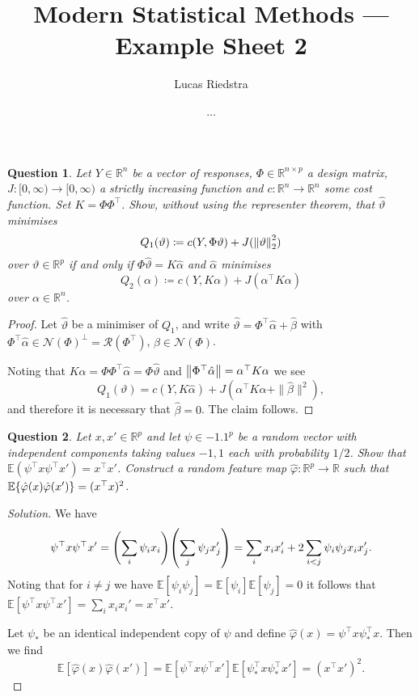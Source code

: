 \documentclass{article}
\title{Modern Statistical Methods --- Example Sheet 2} %
\author{Lucas Riedstra}
\date{...} %
\theoremstyle{plain}
\newtheorem{question}{Question}
\theoremstyle{remark}
\newenvironment{solution}{\begin{proof}[Solution]\renewcommand\qedsymbol{}}{\end{proof}}
\renewcommand{\theta}{\vartheta}
\renewcommand{\phi}{\varphi}
\newcommand{\Bb}{\mathbb}
\newcommand{\Cal}{\mathcal}
\newcommand{\RR}{\Bb R}
\newcommand{\EE}{\Bb E}
\newcommand{\T}{^\top} %
\newcommand\ceq\coloneqq %
\renewcommand\P{^\perp}
\newcommand\Nul{\Cal N}
\newcommand\Ran{\Cal R}
\begin{document}
\maketitle
\begin{question}
	Let $Y \in \RR^n$ be a vector of responses, $\Phi \in \RR^{n \times p}$ a design matrix, $J \colon [0, \infty) \to [0, \infty)$ a strictly increasing function and $c \colon \RR^n \to \RR^n$ some cost function. Set $K = \Phi\Phi\T$. Show, without using the representer theorem, that $\hat\theta$ minimises
	\[
	Q_1(\theta) \ceq c(Y, \Phi\theta) + J(\norm{\theta}_2^2)
	\]
	over $\theta \in \RR^p$ if and only if $\Phi\hat\theta = K\hat\alpha$ and $\hat\alpha$ minimises
	\[
	Q_2(\alpha) \ceq c(Y, K\alpha) + J(\alpha\T K\alpha)
	\]
	over $\alpha \in \RR^n$. 
\end{question}

\begin{proof}
	Let $\hat\theta$ be a minimiser of $Q_1$, and write $\hat\theta = \Phi\T\hat\alpha + \hat\beta$ with $\Phi\T \hat\alpha \in \Nul(\Phi)\P = \Ran(\Phi\T)$, $\hat\beta \in \Nul(\Phi)$. 
	
	Noting that $K\hat\alpha = \Phi\Phi\T \hat\alpha = \Phi\hat\theta$ and  $\norm{\Phi\T\hat\alpha} = \alpha\T K\alpha$ we see
	\[
	Q_1(\theta) = c(Y, K\hat\alpha) + J(\alpha\T K\alpha + \|\hat\beta\|^2),
	\]
	and therefore it is necessary that $\hat\beta = 0$. The claim follows. 
\end{proof}

\begin{question}
	Let $x, x' \in \RR^p$ and let $\psi \in \qty{-1, 1}^p$ be a random vector with independent components taking values $-1, 1$ each with probability $1/2$. Show that $\EE(\psi\T x \psi\T x') = x\T x'$. Construct a random feature map $\hat\phi \colon \RR^p \to \RR$ such that $\EE\qty{\hat\phi(x)\hat\phi(x')} = (x\T x)^2$. 
\end{question}

\begin{solution}
	We have 
	\begin{align*}
		\psi\T x \psi\T x' = \qty(\sum_i \psi_i x_i) \qty(\sum_j \psi_j x'_j) = \sum_i x_i x_i' + 2 \sum_{i < j} \psi_i \psi_j x_i x_j'. 
	\end{align*}
	Noting that for $i \neq j$ we have $\EE[\psi_i \psi_j] = \EE[\psi_i] \EE[\psi_j] = 0$ it follows that $\EE[\psi\T x \psi\T x'] = \sum_i x_i x_i' = x\T x'$. 
	
	Let $\psi_*$  be an identical independent copy of $\psi$ and define $\hat\phi(x) = \psi\T x \psi_*\T x$. Then we find
	\[
	\EE[\hat\phi(x)\hat\phi(x')] = \EE[\psi\T x \psi\T x']\EE[\psi_*\T x \psi_*\T x'] = (x\T x')^2. 
	\]
\end{solution}
\end{document}
